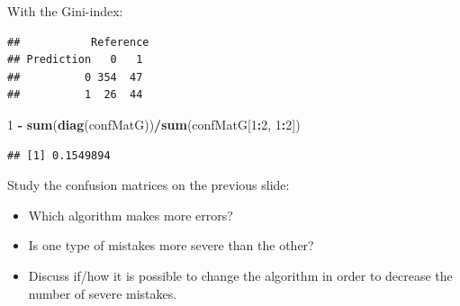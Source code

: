 \documentclass[10pt,ignorenonframetext,]{beamer}
\newenvironment{Shaded}{\begin{snugshade}}{\end{snugshade}}
\newcommand{\KeywordTok}[1]{\textcolor[rgb]{0.13,0.29,0.53}{\textbf{#1}}}
\newcommand{\DataTypeTok}[1]{\textcolor[rgb]{0.13,0.29,0.53}{#1}}
\newcommand{\DecValTok}[1]{\textcolor[rgb]{0.00,0.00,0.81}{#1}}
\newcommand{\StringTok}[1]{\textcolor[rgb]{0.31,0.60,0.02}{#1}}
\newcommand{\OperatorTok}[1]{\textcolor[rgb]{0.81,0.36,0.00}{\textbf{#1}}}
\newcommand{\NormalTok}[1]{#1}
\begin{document}
\begin{frame}[fragile]

\normalsize

With the Gini-index:

\tiny

\begin{Shaded}
\end{Shaded}

\begin{verbatim}
##           Reference
## Prediction   0   1
##          0 354  47
##          1  26  44
\end{verbatim}

\begin{Shaded}
\begin{Highlighting}[]
\DecValTok{1} \OperatorTok{-}\StringTok{ }\KeywordTok{sum}\NormalTok{(}\KeywordTok{diag}\NormalTok{(confMatG))}\OperatorTok{/}\KeywordTok{sum}\NormalTok{(confMatG[}\DecValTok{1}\OperatorTok{:}\DecValTok{2}\NormalTok{, }\DecValTok{1}\OperatorTok{:}\DecValTok{2}\NormalTok{])}
\end{Highlighting}
\end{Shaded}

\begin{verbatim}
## [1] 0.1549894
\end{verbatim}

\end{frame}

\begin{frame}

Study the confusion matrices on the previous slide:

\begin{itemize}
\item
  Which algorithm makes more errors?
\item
  Is one type of mistakes more severe than the other?
\item
  Discuss if/how it is possible to change the algorithm in order to
  decrease the number of severe mistakes.
\end{itemize}

\end{frame}
\end{document}
